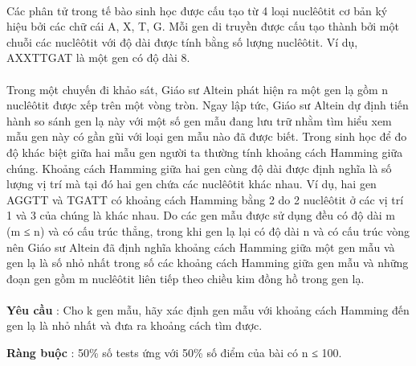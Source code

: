  

Các phân tử trong tế bào sinh học được cấu tạo từ 4 loại nuclêôtit cơ bản ký hiệu bởi các chữ cái A, X, T, G. Mỗi gen di truyền được cấu tạo thành bởi một chuỗi các nuclêôtit với độ dài được tính bằng số lượng nuclêôtit. Ví dụ, AXXTTGAT là một gen có độ dài 8.
\\
\\Trong một chuyến đi khảo sát, Giáo sư Altein phát hiện ra một gen lạ gồm n nuclêôtit được xếp trên một vòng tròn. Ngay lập tức, Giáo sư Altein dự định tiến hành so sánh gen lạ này với một số gen mẫu đang lưu trữ nhằm tìm hiểu xem mẫu gen này có gần gũi với loại gen mẫu nào đã được biết. Trong sinh học để đo độ khác biệt giữa hai mẫu gen người ta thường tính khoảng cách Hamming giữa chúng. Khoảng cách Hamming giữa hai gen cùng độ dài được định nghĩa là số lượng vị trí mà tại đó hai gen chứa các nuclêôtit khác nhau. Ví dụ, hai gen AGGTT và TGATT có khoảng cách Hamming bằng 2 do 2 nuclêôtit ở các vị trí 1 và 3 của chúng là khác nhau. Do các gen mẫu được sử dụng đều có độ dài m (m ≤ n) và có cấu trúc thẳng, trong khi gen lạ lại có độ dài n và có cấu trúc vòng nên Giáo sư Altein đã định nghĩa khoảng cách Hamming giữa một gen mẫu và gen lạ là số nhỏ nhất trong số các khoảng cách Hamming giữa gen mẫu và những đoạn gen gồm m nuclêôtit liên tiếp theo chiều kim đồng hồ trong gen lạ.
\\
\\\textbf{Yêu cầu } : Cho k gen mẫu, hãy xác định gen mẫu với khoảng cách Hamming đến gen lạ là nhỏ nhất và đưa ra khoảng cách tìm được.

\textbf{Ràng buộc } : 50\% số tests ứng với 50\% số điểm của bài có n ≤ 100.

\